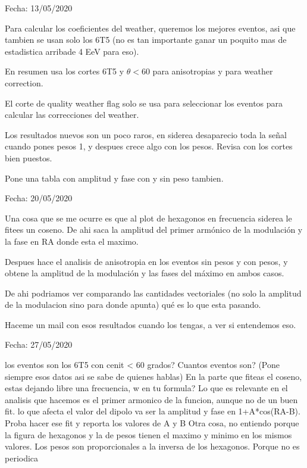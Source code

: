 Fecha: 13/05/2020



\begin{itemize}
\done Para calcular los coeficientes del weather, queremos los mejores eventos, asi que tambien se usan solo los 6T5 (no es tan importante ganar un poquito mas de estadistica arribade 4 EeV para eso).

\done En resumen usa los cortes 6T5 y $\theta<60$ para anisotropias y para weather correction.

\done El corte de quality weather flag solo se usa para seleccionar los eventos para calcular las correcciones del weather.

\done Los resultados nuevos son un poco raros, en siderea desaparecio toda la señal cuando pones pesos 1, y despues crece algo con los pesos. Revisa con los cortes bien puestos.

\done Pone una tabla con amplitud y fase con y sin peso tambien.

\end{itemize}


Fecha: 20/05/2020

\begin{itemize}


\done Una cosa que se me ocurre es que al plot de hexagonos en frecuencia siderea le fitees un coseno. De ahi saca la amplitud del primer armónico de la modulación y la fase en RA donde esta el maximo.

\done Despues hace el analisis de anisotropia en los eventos sin pesos y con pesos, y obtene la amplitud de la modulación y las fases del máximo en ambos casos.

\done De ahi podriamos ver comparando las cantidades vectoriales (no solo la amplitud de la modulacion sino para donde apunta) qué es lo que esta pasando.

\done Haceme un mail con esos resultados cuando los tengas, a ver si entendemos eso.

\end{itemize}



Fecha: 27/05/2020

\begin{itemize}
	\done los eventos son los 6T5 con cenit < 60 grados? Cuantos eventos son? (Pone siempre esos datos asi se sabe de quienes hablas)
	\done En la parte que fiteas el coseno, estas dejando libre una frecuencia, w en tu formula? 
	\done Lo que es relevante en el analisis que hacemos es el primer armonico de la funcion, aunque no de un buen fit. lo que afecta el valor del dipolo va ser la amplitud y fase en 1+A*cos(RA-B). Proba hacer ese fit y reporta los valores de A y B
	\done Otra cosa, no entiendo porque la figura de hexagonos y la de pesos tienen el maximo y minimo en los mismos valores. Los pesos son proporcionales a la inversa de los hexagonos.
	\done Porque no es periodica
\end{itemize}




